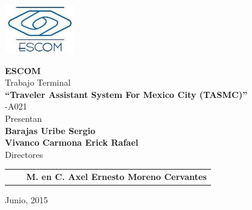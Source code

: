 \begin{minipage}[c][0.8\textheight][t]{0.2\textwidth}
\begin{center}
        \hskip2pt
    	    \latexcolumnseprulecolor \vrule width2pt height19.3cm
        \hskip0.6mm
	   \vrule width3.5pt height19.3cm
        \hskip0.6mm
        \vrule width2pt height19.3cm \\
        \includegraphics[height=2.1cm]{portada/escomC.jpg}
        \end{center}
\end{minipage}
\begin{minipage}[c][0.8\textheight][c]{0.8\textwidth}
	\begin{center}
   		\vspace{2cm}
    		{\fontsize{19}{29}\selectfont \bf ESCOM}\\
    		\vspace{1.5cm}
	    {\fontsize{14}{24}\selectfont Trabajo Terminal}\\
	    \vspace{0.3cm}
	    {\fontsize{16}{26}\selectfont \bf ``Traveler Assistant System For Mexico City (TASMC)''}\\
	    \vspace{0.3cm}
	    {\fontsize{14}{24}-A021}\\
	    \vspace{1cm}
	    {\fontsize{14}{24}\selectfont Presentan}\\
	    \vspace{0.1cm}
	    {\fontsize{15}{25}\selectfont \bf Barajas Uribe Sergio}\\
	    \vspace{0.1cm}
	    {\fontsize{15}{25}\selectfont \bf Vivanco Carmona Erick Rafael}\\
	    \vspace{1cm}
	    {\fontsize{14}{24}\selectfont Directores}\\
	    \vspace{0.1cm}
	\end{center}
	\begin{tabular}{>{\centering}p{5cm}p{1cm}>{\centering}p{5cm}}
		{\centering \fontsize{15}{25}\selectfont \bf M. en C. Macario Hernández Cruz} &
	    	& {\centering \fontsize{15}{25}\selectfont \bf M. en C. Axel Ernesto Moreno Cervantes}\\
	\end{tabular}
	\vspace{5cm}
	\begin{flushright}
		{\fontsize{14}{24}\selectfont Junio, 2015}\\	
	\end{flushright}
\end{minipage}